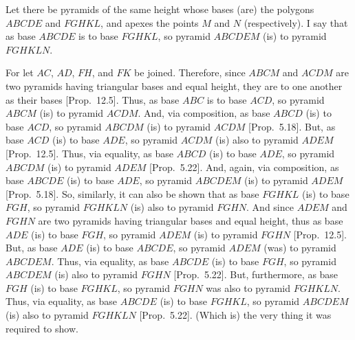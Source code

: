 \begin{Parallel}{}{}
{
\centerline{}

Let there be pyramids of the same height whose bases (are) the polygons $ABCDE$ and $FGHKL$,
and apexes the points $M$ and $N$ (respectively). I say that as base $ABCDE$ is to base $FGHKL$,
so pyramid $ABCDEM$ (is) to pyramid $FGHKLN$.

For let $AC$, $AD$, $FH$, and $FK$ be joined. Therefore, since $ABCM$ and
$ACDM$ are two pyramids having triangular bases and equal height, they are to one another
as their bases [Prop.~12.5]. Thus, as base $ABC$ is to base $ACD$, so pyramid 
$ABCM$ (is) to pyramid $ACDM$.  And, via composition, as base $ABCD$ (is) to base $ACD$, so
pyramid $ABCDM$ (is) to pyramid $ACDM$ [Prop.~5.18]. But, as base
$ACD$ (is) to base $ADE$, so pyramid $ACDM$ (is) also to pyramid $ADEM$ [Prop.~12.5]. Thus, via equality, 
as base $ABCD$ (is) to base $ADE$, so pyramid $ABCDM$ (is) to  pyramid $ADEM$ [Prop.~5.22]. And, again, via composition, as base $ABCDE$ (is) to base $ADE$,
so pyramid $ABCDEM$ (is) to pyramid $ADEM$ [Prop.~5.18]. 
So, similarly, it can also be shown that as base $FGHKL$ (is) to base $FGH$, so pyramid 
$FGHKLN$ (is) also to pyramid $FGHN$. And since $ADEM$ and $FGHN$ are two
pyramids having triangular bases and equal height,  thus as base $ADE$ (is) to base $FGH$, so
pyramid $ADEM$ (is) to pyramid $FGHN$ [Prop.~12.5]. 
But, as base $ADE$ (is) to base $ABCDE$,  so pyramid $ADEM$ (was) to 
pyramid $ABCDEM$. Thus, via equality,  as base $ABCDE$ (is) to base $FGH$,
so pyramid $ABCDEM$ (is) also to pyramid $FGHN$ [Prop.~5.22]. But,
furthermore, as base $FGH$ (is) to base $FGHKL$, so pyramid $FGHN$ was also to pyramid
$FGHKLN$. Thus, via equality, as base $ABCDE$ (is) to base $FGHKL$, so
pyramid $ABCDEM$ (is) also to pyramid $FGHKLN$  [Prop.~5.22]. (Which is) the very thing it was required
to show.}
\end{Parallel}

